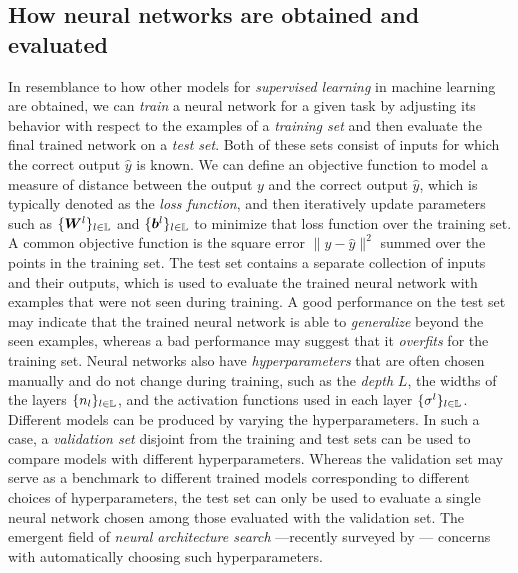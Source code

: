 \subsection{How neural networks are obtained and evaluated}
In resemblance to how other models for \emph{supervised learning} in machine learning are obtained,  
we can \emph{train} a neural network for a given task by adjusting its behavior with respect to the examples of a \emph{training set} and then evaluate the final trained network on a \emph{test set}. 
Both of these sets consist of inputs for which the correct output $\hat{y}$ is known. 
We can define an objective function to model %
a measure of distance 
between the output $y$ and the correct output $\hat{y}$, which is typically denoted as the \emph{loss function}, and then iteratively update parameters such as $\{ {\bm{W}}^l \}_{l \in {\mathbb{L}}}$ and $\{ {\bm{b}}^l \}_{l \in {\mathbb{L}}}$ to minimize that loss function over the training set. A common objective function is the square error $\|y - \hat{y}\|^2$ summed over the points in the training set. 
The test set contains a separate collection of inputs and their outputs, 
which is used to evaluate the trained neural network with examples that were not seen during training. 
A good performance on the test set may indicate that the trained neural network is able to \emph{generalize} beyond the seen examples, whereas a bad performance may suggest that it \emph{overfits} for the training set. 
Neural networks also have \emph{hyperparameters} that are often chosen manually and do not change during training, such as the \emph{depth} $L$, the widths of the layers $\{ n_l \}_{l \in {\mathbb{L}}}$, and the activation functions used in each layer $\{ \sigma^l \}_{l \in {\mathbb{L}}}$. 
Different models can be produced by varying the hyperparameters. 
In such a case, a \emph{validation set} disjoint from the training and test sets can be used to compare models with different hyperparameters. 
Whereas the validation set may serve as a benchmark to different trained models corresponding to different choices of hyperparameters, 
the test set can only be used to evaluate a single neural network chosen among those evaluated with the validation set. 
The emergent field of \emph{neural architecture search} ---recently surveyed by \cite{NAS}--- concerns with automatically choosing such hyperparameters. 

